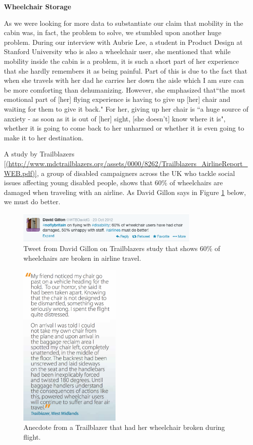 \textbf{Wheelchair Storage}

As we were looking for more data to substantiate our claim that mobility in the cabin was, in fact, the problem to solve, we stumbled upon another huge problem. During our interview with Aubrie Lee, a student in Product Design at Stanford University who is also a wheelchair user, she mentioned that while mobility inside the cabin is a problem, it is such a short part of her experience that she hardly remembers it as being painful. Part of this is due to the fact that when she travels with her dad he carries her down the aisle which I am sure can be more comforting than dehumanizing. However, she emphasized that``the most emotional part of [her] flying experience is having to give up [her] chair and waiting for them to give it back." For her, giving up her chair is ``a huge source of anxiety - as soon as it is out of [her] sight, [she doesn't] know where it is", whether it is going to come back to her unharmed or whether it is even going to make it to her destination. 

A study by Trailblazers \ref{(http://www.mdctrailblazers.org/assets/0000/8262/Trailblazers_AirlineReport_WEB.pdf)}, a group of disabled campaigners across the UK who tackle social issues affecting young disabled people, shows that 60\% of wheelchairs are damaged when traveling with an airline. As David Gillon says in Figure \ref{fig:60percenttweet.png} below, we must do better. 


\begin{figure}[h]
  \centering
     \includegraphics[width=9cm]{images/60percenttweet.png}
   \caption{Tweet from David Gillon on Trailblazers study that shows 60\% of wheelchairs are broken in airline travel. }
  \label{fig:60percenttweet.png}
\end{figure}

\begin{figure}[h]
  \centering
     \includegraphics[width=5cm]{images/wheelchairstory.png}
   \caption{Anecdote from a Trailblazer that had her wheelchair broken during flight.}
  \label{fig:wheelchairstory.png}
\end{figure}

